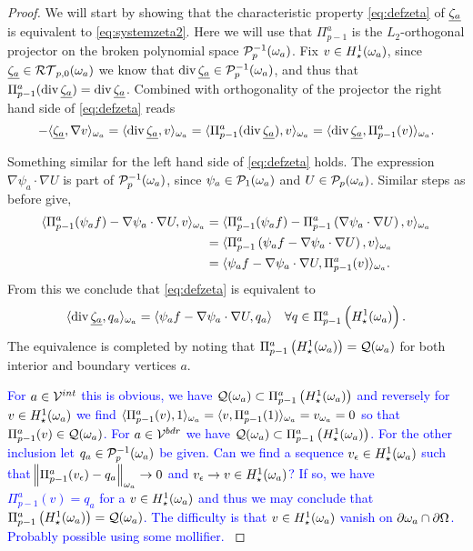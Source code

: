 \documentclass[thesis.tex]{subfiles}
\begin{document}
\begin{proof}
  We will start by showing that the characteristic property \eqref{eq:defzeta}  of $\underline{\zeta_a}$ is equivalent to \eqref{eq:systemzeta2}.
  Here we will use that $\Pi_{p-1}^a$ is the $L_2$-orthogonal projector on the broken polynomial space $\mathcal{P}_p^{-1}(\omega_a)$.  Fix $v \in H_\star^1(\omega_a)$, 
  since $\underline{\zeta_a} \in \mathcal{RT}_{p,0}(\omega_a)$ we know that $\operatorname{div} \underline{\zeta_a} \in \mathcal{P}_p^{-1}(\omega_a)$, and thus that $\Pi_{p-1}^a( \operatorname{div} \underline{\zeta_a} )= \operatorname{div} \underline{\zeta_a}$. Combined with orthogonality of the projector the right hand side of \eqref{eq:defzeta} reads
  \[
    -\langle \underline{\zeta_a}, \nabla v \rangle_{\omega_a} = \langle \operatorname{div} \underline{\zeta_a}, v \rangle_{\omega_a} = \langle  \Pi_{p-1}^a(\operatorname{div} \underline{\zeta_a}), v \rangle_{\omega_a} = \langle \operatorname{div} \underline{\zeta_a}, \Pi_{p-1}^a(v) \rangle_{\omega_a}.
  \]

  Something similar for the left hand side of \eqref{eq:defzeta} holds. The expression $\nabla \psi_a \cdot \nabla U$ is part of
  $\mathcal{P}_p^{-1}(\omega_a)$, since $\psi_a \in \mathcal{P}_1(\omega_a)$ and $U \in \mathcal{P}_{p}(\omega_a)$. Similar steps as before give, 
  \begin{align*}
    \langle \Pi_{p-1}^a(\psi_a f) - \nabla \psi_a \cdot \nabla U, v \rangle_{\omega_a} &= \langle \Pi_{p-1}^a(\psi_a f) - \Pi_{p-1}^a\left(\nabla \psi_a \cdot \nabla U\right),v \rangle_{\omega_a}\\
    &= \langle \Pi_{p-1}^a\left(\psi_a f - \nabla \psi_a \cdot \nabla U\right), v \rangle_{\omega_a}\\
    &= \langle \psi_a f - \nabla \psi_a \cdot \nabla U, \Pi_{p-1}^a(v) \rangle_{\omega_a}.
  \end{align*}
  From this we conclude that \eqref{eq:defzeta} is equivalent to
  \begin{equation}
    \label{eq:defzetanoproj}
    \langle \operatorname{div} \underline{\zeta_a}, q_a \rangle_{\omega_a} = \langle \psi_a f - \nabla \psi_a \cdot \nabla U, q_a \rangle \quad \forall q \in \Pi_{p-1}^a\left(H_\star^1(\omega_a)\right).
  \end{equation}
  The equivalence is completed by  noting that $\Pi_{p-1}^a\left(H_\star^1(\omega_a)\right) = \mathcal{Q}(\omega_a)$ for both interior and boundary vertices $a$.

  \textcolor{blue}{
  For $a \in \mathcal{V}^{int}$ this is obvious, we have $\mathcal{Q}(\omega_a) \subset \Pi_{p-1}^a\left(H_\star^1(\omega_a)\right)$ and reversely for $v \in H_\star^1(\omega_a)$
  we find  $\langle \Pi_{p-1}^a(v), 1 \rangle_{\omega_a} = \langle v,\Pi_{p-1}^a(1) \rangle_{\omega_a} = v_{\omega_a} = 0$ so that $\Pi_{p-1}^a(v) \in \mathcal{Q}(\omega_a)$.
  For $a \in \mathcal{V}^{bdr}$ we have $\mathcal{Q}(\omega_a) \subset \Pi_{p-1}^a\left(H_\star^1(\omega_a)\right)$. 
  For the other inclusion let $q_a \in \mathcal{P}_p^{-1}(\omega_a)$ be given.
  Can we find a sequence $v_\epsilon \in H_\star^1(\omega_a)$ such that $\norm{\Pi_{p-1}^a(v_\epsilon) - q_a}_{\omega_a} \to 0$ 
  and $v_\epsilon \to v \in H_\star^1(\omega_a)$? If so, we have $\Pi_{p-1}^a(v) = q_a$ for a $v \in H_\star^1(\omega_a)$ and thus we may conclude
  that $\Pi_{p-1}^a\left(H_\star^1(\omega_a)\right) = \mathcal{Q}(\omega_a)$. The difficulty is that $v \in H_\star^1(\omega_a)$ vanish on $\partial \omega_a \cap \partial \Omega$. Probably possible using some mollifier.  }


\end{proof}
\end{document}

